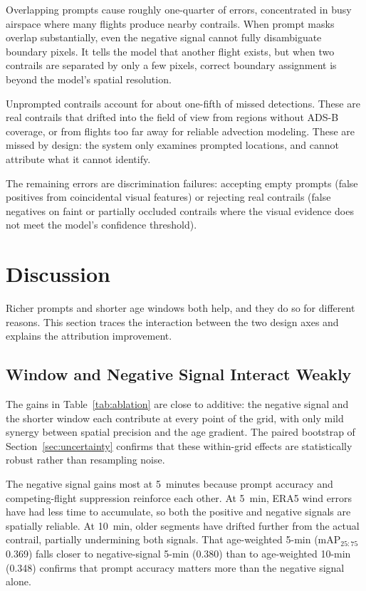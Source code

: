 \documentclass[1p,11pt]{elsarticle}
\begin{document}
Overlapping prompts cause roughly one-quarter of errors, concentrated in busy airspace where many flights produce nearby contrails. When prompt masks overlap substantially, even the negative signal cannot fully disambiguate boundary pixels. It tells the model that another flight exists, but when two contrails are separated by only a few pixels, correct boundary assignment is beyond the model's spatial resolution.

Unprompted contrails account for about one-fifth of missed detections. These are real contrails that drifted into the field of view from regions without ADS-B coverage, or from flights too far away for reliable advection modeling. These are missed by design: the system only examines prompted locations, and cannot attribute what it cannot identify.

The remaining errors are discrimination failures: accepting empty prompts (false positives from coincidental visual features) or rejecting real contrails (false negatives on faint or partially occluded contrails where the visual evidence does not meet the model's confidence threshold).

\section{Discussion}
\label{sec:discussion}

Richer prompts and shorter age windows both help, and they do so for different reasons. This section traces the interaction between the two design axes and explains the attribution improvement.

\subsection{Window and Negative Signal Interact Weakly}

The gains in Table~\ref{tab:ablation} are close to additive: the negative signal and the shorter window each contribute at every point of the grid, with only mild synergy between spatial precision and the age gradient. The paired bootstrap of Section~\ref{sec:uncertainty} confirms that these within-grid effects are statistically robust rather than resampling noise.

The negative signal gains most at 5~minutes because prompt accuracy and competing-flight suppression reinforce each other. At 5~min, ERA5 wind errors have had less time to accumulate, so both the positive and negative signals are spatially reliable. At 10~min, older segments have drifted further from the actual contrail, partially undermining both signals. That age-weighted 5-min (mAP$_{25{:}75}$ 0.369) falls closer to negative-signal 5-min (0.380) than to age-weighted 10-min (0.348) confirms that prompt accuracy matters more than the negative signal alone.
\end{document}
